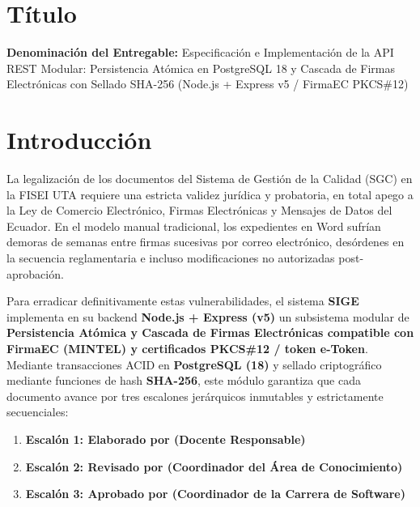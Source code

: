 \documentclass[12pt,a4paper]{article}
\begin{document}

\vspace{0.25cm}
\section{Título}
\textbf{Denominación del Entregable:} Especificación e Implementación de la API REST Modular: Persistencia Atómica en PostgreSQL 18 y Cascada de Firmas Electrónicas con Sellado SHA-256 (Node.js + Express v5 / FirmaEC PKCS\#12)



\section{Introducción}
La legalización de los documentos del Sistema de Gestión de la Calidad (SGC) en la FISEI UTA requiere una estricta validez jurídica y probatoria, en total apego a la Ley de Comercio Electrónico, Firmas Electrónicas y Mensajes de Datos del Ecuador. En el modelo manual tradicional, los expedientes en Word sufrían demoras de semanas entre firmas sucesivas por correo electrónico, desórdenes en la secuencia reglamentaria e incluso modificaciones no autorizadas post-aprobación.

Para erradicar definitivamente estas vulnerabilidades, el sistema \textbf{SIGE} implementa en su backend \textbf{Node.js + Express (v5)} un subsistema modular de \textbf{Persistencia Atómica y Cascada de Firmas Electrónicas compatible con FirmaEC (MINTEL) y certificados PKCS\#12 / token e-Token}. Mediante transacciones ACID en \textbf{PostgreSQL (18)} y sellado criptográfico mediante funciones de hash \textbf{SHA-256}, este módulo garantiza que cada documento avance por tres escalones jerárquicos inmutables y estrictamente secuenciales:
\begin{enumerate}[leftmargin=1.5em, itemsep=1.5pt]
    \item \textbf{Escalón 1: Elaborado por (Docente Responsable)}
    \item \textbf{Escalón 2: Revisado por (Coordinador del Área de Conocimiento)}
    \item \textbf{Escalón 3: Aprobado por (Coordinador de la Carrera de Software)}
\end{enumerate}
\end{document}
